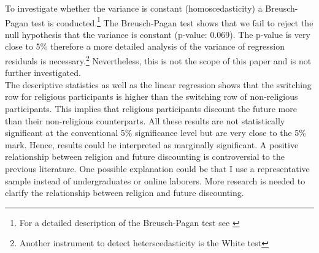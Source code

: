 \documentclass[10pt,a4paper]{article}
\begin{document}

To investigate whether the variance is constant (homoscedasticity) a Breusch-Pagan test is conducted.\footnote{For a detailed description of the Breusch-Pagan test see \textcite{wooldridge2015introductory}} The Breusch-Pagan test shows that we fail to reject the null hypothesis that the variance is constant (p-value: 0.069). The p-value is very close to 5\% therefore a more detailed analysis of the variance of regression residuals is necessary.\footnote{Another instrument to detect heterscedasticity is the White test} Nevertheless, this is not the scope of this paper and is not further investigated.\\

The descriptive statistics as well as the linear regression shows that the switching row for religious participants is higher than the switching row of non-religious participants. This implies that religious participants discount the future more than their non-religious counterparts. All these results are not statistically significant at the conventional 5\% significance level but are very close to the 5\% mark. Hence, results could be interpreted as marginally significant. A positive relationship between religion and future discounting is controversial to the previous literature. One possible explanation could be that I use a representative sample instead of undergraduates or online laborers. More research is needed to clarify the relationship between religion and future discounting.\\

\end{document}
